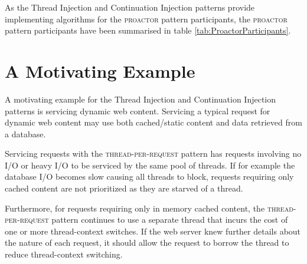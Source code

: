 \documentclass[prodmode]{style/acmlarge}
\begin{document}
As the Thread Injection and Continuation Injection patterns provide implementing
algorithms for the \textsc{proactor} pattern participants, the \textsc{proactor}
pattern participants have been summarised in table
\ref{tab:ProactorParticipants}.

\begin{table}[t]
\label{tab:ProactorParticipants}
\end{table}



\section{A Motivating Example}

A motivating example for the Thread Injection and Continuation Injection
patterns is servicing dynamic web content.  Servicing a typical request for
dynamic web content may use both cached/static content and data retrieved from a
database.

Servicing requests with the \textsc{thread-per-request} pattern has requests
involving no I/O or heavy I/O to be serviced by the same pool of threads.  If for
example the database I/O becomes slow causing all threads to block, requests
requiring only cached content are not prioritized as they are starved of a
thread.

Furthermore, for requests requiring only in memory cached content, the
\textsc{thread-per-request} pattern continues to use a separate thread that
incurs the cost of one or more thread-context switches.  If the web server knew
further details about the nature of each request, it should allow the request to
borrow the thread to reduce thread-context switching.
\end{document}
